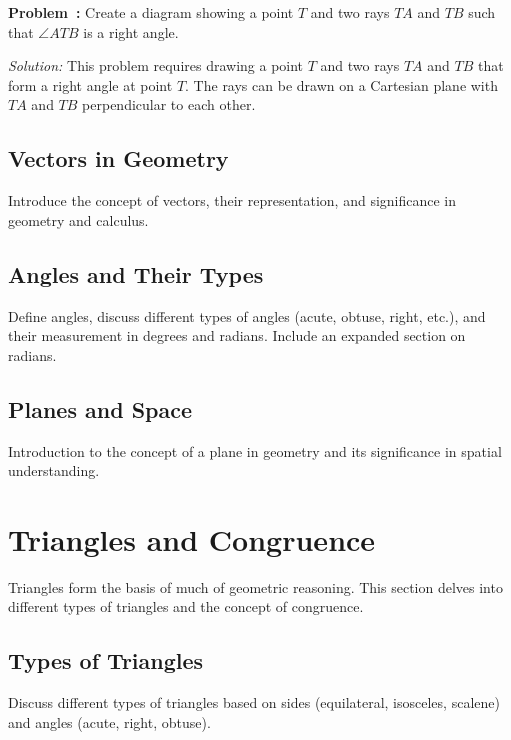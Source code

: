 \documentclass[a4paper,12pt]{book}
\newcounter{problem}
\newenvironment{problem}[1][\theproblem]
{\refstepcounter{problem}\par\medskip\noindent\textbf{Problem~#1:} \rmfamily}{\medskip}
\newenvironment{solution}[1][]
{\par\noindent\textit{Solution:} \rmfamily}{\medskip}
\begin{document}
\begin{problem}
Create a diagram showing a point \( T \) and two rays \( TA \) and \( TB \) such that \( \angle ATB \) is a right angle.
\end{problem}

\begin{solution}
This problem requires drawing a point \( T \) and two rays \( TA \) and \( TB \) that form a right angle at point \( T \). The rays can be drawn on a Cartesian plane with \( TA \) and \( TB \) perpendicular to each other.
\end{solution}





\subsection{Vectors in Geometry}
\label{subsec:vectors_in_geometry}
Introduce the concept of vectors, their representation, and significance in geometry and calculus.


\subsection{Angles and Their Types}
\label{subsec:angles_and_their_types}
Define angles, discuss different types of angles (acute, obtuse, right, etc.), and their measurement in degrees and radians. Include an expanded section on radians.


\subsection{Planes and Space}
\label{subsec:planes_and_space}
Introduction to the concept of a plane in geometry and its significance in spatial understanding.


\section{Triangles and Congruence}
\label{sec:triangles_and_congruence}
Triangles form the basis of much of geometric reasoning. This section delves into different types of triangles and the concept of congruence.


\subsection{Types of Triangles}
\label{subsec:types_of_triangles}
Discuss different types of triangles based on sides (equilateral, isosceles, scalene) and angles (acute, right, obtuse).
\end{document}
